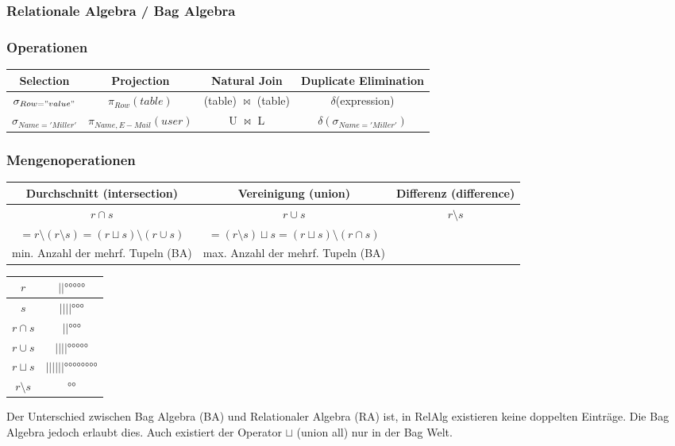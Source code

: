 
\subsubsection*{Relationale Algebra / Bag Algebra}


\subsubsection*{Operationen}

\begin{tabular}{|c|c|c|c|}
\hline 
Selection & Projection & Natural Join & Duplicate Elimination\tabularnewline
\hline 
\hline 
$\sigma_{Row="value"}$ & $\pi_{Row}(table)$ & (table) $\bowtie$ (table) & $\delta$(expression)\tabularnewline
\hline 
$\sigma_{Name='Miller'}$ & $\pi_{Name,E-Mail}(user)$ & U $\bowtie$ L & $\delta(\sigma_{Name='Miller'})$\tabularnewline
\hline 
\end{tabular}


\subsubsection*{Mengenoperationen}

\begin{tabular}{|c|c|c|}
\hline 
Durchschnitt (intersection) & Vereinigung (union) & Differenz (difference)\tabularnewline
\hline 
\hline 
$r\cap s$  &  $r\cup s$  & $r\setminus s$\tabularnewline
\hline 
$=r\setminus(r\setminus s)=(r\sqcup s)\setminus(r\cup s)$ & $=(r\setminus s)\sqcup s=(r\sqcup s)\setminus(r\cap s)$ & \tabularnewline
\hline 
min. Anzahl der mehrf. Tupeln (BA) & max. Anzahl der mehrf. Tupeln (BA) & \tabularnewline
\hline 
\end{tabular}%
\begin{tabular}{|c||c|}
\hline 
$r$ & $||\text{°°°°°}$\tabularnewline
\hline 
$s$ & $||||\text{°°°}$\tabularnewline
\hline 
$r\cap s$ & $||\text{°°°}$\tabularnewline
\hline 
$r\cup s$ & $||||\text{°°°°°}$\tabularnewline
\hline 
$r\sqcup s$ & $||||||\text{°°°°°°°°}$\tabularnewline
\hline 
$r\setminus s$ & $\text{°°}$\tabularnewline
\hline 
\end{tabular}

Der Unterschied zwischen Bag Algebra (BA) und Relationaler Algebra
(RA) ist, in RelAlg existieren keine doppelten Einträge. Die Bag Algebra
jedoch erlaubt dies. Auch existiert der Operator $\sqcup$ (union
all) nur in der Bag Welt.
